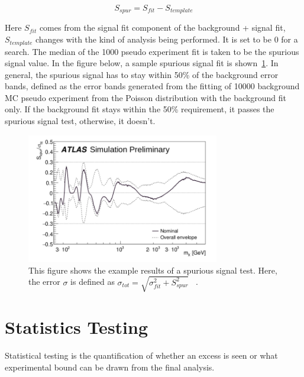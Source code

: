     \begin{equation}
        S_{spur} = S_{fit} - S_{template}
    \end{equation}

    Here $S_{fit}$ comes from the signal fit component of the background + signal fit, $S_{template}$ changes with the kind of analysis being performed. It is set to be 0 for a search. 
    The median of the 1000 pseudo experiment fit is taken to be the spurious signal value. 
    In the figure below, a sample spurious signal fit is shown~\ref{spurioussignal}.
    In general, the spurious signal has to stay within 50\% of the background error bands, defined as the error bands generated from the fitting of 10000 background MC pseudo experiment from the Poisson distribution with the background fit only.
    If the background fit stays within the 50\% requirement, it passes the spurious signal test, otherwise, it doesn't. 

\begin{figure}[!htb]
    \begin{center}
        \includegraphics[width=0.75\textwidth]{figures/chapter_analysismethod/Spurious}
        \caption{
            This figure shows the example results of a spurious signal test. Here, the error $\sigma$ is defined as $\sigma_{tot} = \sqrt{\sigma^{2}_{fit}+ S_{spur}^{2}}$ ~\cite{ATL-PHYS-PUB-2020-028}.
        }
        \label{spurioussignal}
    \end{center}
\end{figure}
\FloatBarrier

\section{Statistics Testing}
\label{section:stats}
Statistical testing is the quantification of whether an excess is seen or what experimental bound can be drawn from the final analysis. 

